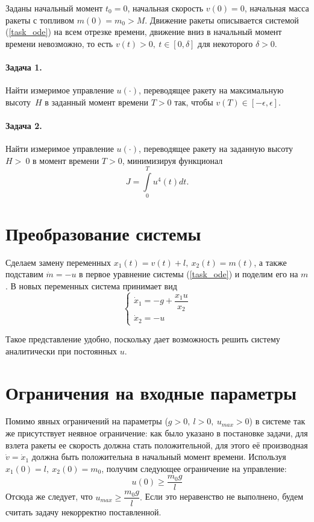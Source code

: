 \documentclass[16pt]{article}
\newcommand\A{(\cdot)}
\newcommand\Int[2]{\int\limits_{#1}^{#2}}
\begin{document}
Заданы начальный момент $t_0 = 0$, начальная скорость $v(0) = 0$, начальная масса ракеты с топливом $m(0) = 
m_0 > M$. Движение ракеты описывается системой (\ref{task_ode}) на всем отрезке времени, движение вниз в 
начальный момент времени невозможно, то есть $v(t) > 0, \  t \in [0, \delta]$ для некоторого $\delta > 0$.
\paragraph{Задача 1.} 
Найти измеримое управление $u\A$, переводящее ракету на максимальную высоту~$H$ в заданный момент времени $T > 0$
 так, чтобы $v(T) \in [-\epsilon,\epsilon]$.

\paragraph{Задача 2.} Найти измеримое управление $u\A$, переводящее ракету на заданную высоту $H >~0$ в момент
 времени $T > 0$, минимизируя функционал
 $$ J = \Int{0}{T} u^4(t)dt.$$

\section{Преобразование системы}
Сделаем замену переменных $x_1(t) = v(t) + l, \ x_2(t) = m(t)$, а также подставим $\dot{m} = -u$
в первое уравнение системы (\ref{task_ode}) и поделим его на $m$.
В новых переменных система принимает вид
\begin{equation}
\begin{cases} \label{rocket_ode}
\dot{x}_1 = -g + \dfrac{x_1u}{x_2} \\
\dot{x}_2 = -u
\end{cases}
\end{equation}

Такое представление удобно, поскольку дает возможность решить систему аналитически при постоянных $u$.
\section{Ограничения на входные параметры}
Помимо явных ограничений на параметры ($g > 0,\ l > 0,\ u_{max} > 0$) в системе так же присутствует неявное
ограничение: как было указано в постановке задачи, для взлета ракеты ее скорость должна стать положительной, 
для этого её производная $\dot{v} = \dot{x}_1$ должна быть положительна в начальный момент времени. 
Используя $x_1(0) = l, \ x_2(0) = m_0$, получим следующее ограничение на управление:
\begin{equation} \label{u0_restr}
u(0) \geqslant \dfrac{m_0g}{l}
\end{equation}
Отсюда же следует, что
$ u_{max} \geqslant \dfrac{m_0g}{l}.$ Если это неравенство не выполнено, будем считать задачу некорректно поставленной.
\end{document}
